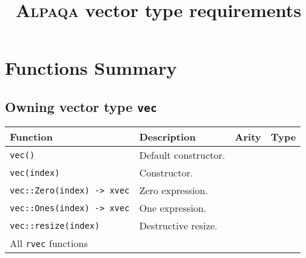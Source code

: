 \documentclass{article}
\begin{document}
\title{\textsc{Alpaqa} vector type requirements}
\author{}
\date{}
\maketitle

\section*{Functions Summary}

\subsection*{Owning vector type \texttt{vec}}

\begin{tabular}{|p{7.2cm}|p{5.8cm}|p{0.95cm}|p{1.15cm}|}
\hline
\textbf{Function} & \textbf{Description} & \textbf{Arity} & \textbf{Type}\\\hline
\lstinline|vec()| & Default constructor. & & \\\hline
\lstinline|vec(index)| & Constructor. & & \\\hline
\lstinline|vec::Zero(index) -> xvec| & Zero expression. & & \\\hline
\lstinline|vec::Ones(index) -> xvec| & One expression. & & \\\hline
\lstinline|vec::resize(index)| & Destructive resize. & & \\\hline
All \lstinline|rvec| functions & & & \\\hline
\end{tabular}
\end{document}
